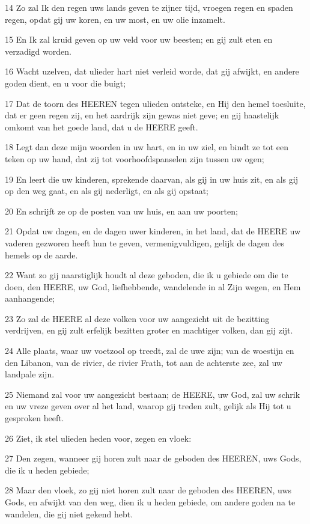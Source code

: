 \par 14 Zo zal Ik den regen uws lands geven te zijner tijd, vroegen regen en spaden regen, opdat gij uw koren, en uw most, en uw olie inzamelt.
\par 15 En Ik zal kruid geven op uw veld voor uw beesten; en gij zult eten en verzadigd worden.
\par 16 Wacht uzelven, dat ulieder hart niet verleid worde, dat gij afwijkt, en andere goden dient, en u voor die buigt;
\par 17 Dat de toorn des HEEREN tegen ulieden ontsteke, en Hij den hemel toesluite, dat er geen regen zij, en het aardrijk zijn gewas niet geve; en gij haastelijk omkomt van het goede land, dat u de HEERE geeft.
\par 18 Legt dan deze mijn woorden in uw hart, en in uw ziel, en bindt ze tot een teken op uw hand, dat zij tot voorhoofdspanselen zijn tussen uw ogen;
\par 19 En leert die uw kinderen, sprekende daarvan, als gij in uw huis zit, en als gij op den weg gaat, en als gij nederligt, en als gij opstaat;
\par 20 En schrijft ze op de posten van uw huis, en aan uw poorten;
\par 21 Opdat uw dagen, en de dagen uwer kinderen, in het land, dat de HEERE uw vaderen gezworen heeft hun te geven, vermenigvuldigen, gelijk de dagen des hemels op de aarde.
\par 22 Want zo gij naarstiglijk houdt al deze geboden, die ik u gebiede om die te doen, den HEERE, uw God, liefhebbende, wandelende in al Zijn wegen, en Hem aanhangende;
\par 23 Zo zal de HEERE al deze volken voor uw aangezicht uit de bezitting verdrijven, en gij zult erfelijk bezitten groter en machtiger volken, dan gij zijt.
\par 24 Alle plaats, waar uw voetzool op treedt, zal de uwe zijn; van de woestijn en den Libanon, van de rivier, de rivier Frath, tot aan de achterste zee, zal uw landpale zijn.
\par 25 Niemand zal voor uw aangezicht bestaan; de HEERE, uw God, zal uw schrik en uw vreze geven over al het land, waarop gij treden zult, gelijk als Hij tot u gesproken heeft.
\par 26 Ziet, ik stel ulieden heden voor, zegen en vloek:
\par 27 Den zegen, wanneer gij horen zult naar de geboden des HEEREN, uws Gods, die ik u heden gebiede;
\par 28 Maar den vloek, zo gij niet horen zult naar de geboden des HEEREN, uws Gods, en afwijkt van den weg, dien ik u heden gebiede, om andere goden na te wandelen, die gij niet gekend hebt.
